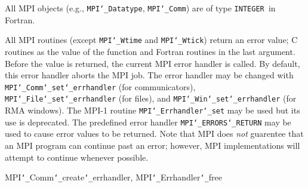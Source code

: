 All MPI objects (e.g., {\tt MPI{\tt \char`\_}Datatype}, {\tt MPI{\tt \char`\_}Comm}) are of type {\tt INTEGER
}in Fortran.
\par
{}
\par
All MPI routines (except {\tt MPI{\tt \char`\_}Wtime} and {\tt MPI{\tt \char`\_}Wtick}) return an error value;
C routines as the value of the function and Fortran routines in the last
argument.  Before the value is returned, the current MPI error handler is
called.  By default, this error handler aborts the MPI job.  The error handler
may be changed with {\tt MPI{\tt \char`\_}Comm{\tt \char`\_}set{\tt \char`\_}errhandler} (for communicators),
{\tt MPI{\tt \char`\_}File{\tt \char`\_}set{\tt \char`\_}errhandler} (for files), and {\tt MPI{\tt \char`\_}Win{\tt \char`\_}set{\tt \char`\_}errhandler} (for
RMA windows).  The MPI-1 routine {\tt MPI{\tt \char`\_}Errhandler{\tt \char`\_}set} may be used but
its use is deprecated.  The predefined error handler
{\tt MPI{\tt \char`\_}ERRORS{\tt \char`\_}RETURN} may be used to cause error values to be returned.
Note that MPI does {\em not} guarentee that an MPI program can continue past
an error; however, MPI implementations will attempt to continue whenever
possible.
\par
{}
\par
{}
 MPI{\tt \char`\_}Comm{\tt \char`\_}create{\tt \char`\_}errhandler, MPI{\tt \char`\_}Errhandler{\tt \char`\_}free
\nextline
{}
\endmanpage
